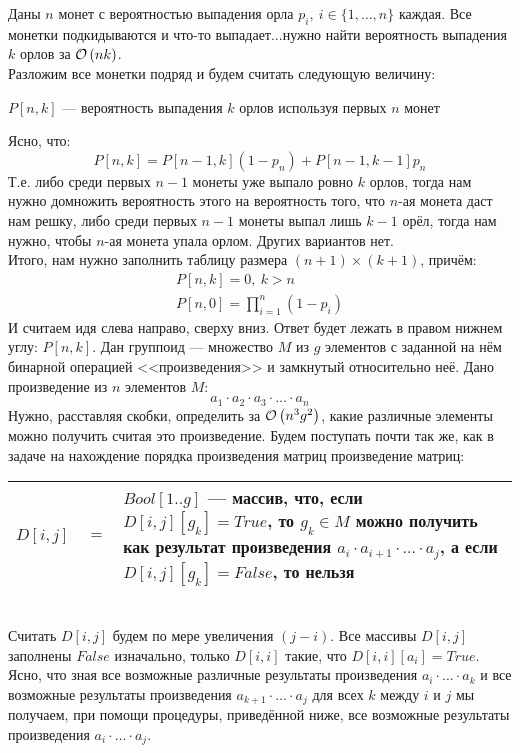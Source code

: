 Даны $n$ монет с вероятностью выпадения орла $p_i,\ i \in \lbrace 1,\ldots,n \rbrace$ каждая. Все монетки подкидываются
и что-то выпадает...нужно найти вероятность выпадения $k$ орлов за $\mathcal{O}\left(nk\right)$.\\
Разложим все монетки подряд и будем считать следующую величину: 
\begin{center}
$P[n,k]$ --- вероятность выпадения $k$ орлов используя первых $n$ монет
\end{center}
Ясно, что:
\[
P[n,k] = P[n-1,k](1-p_n)+P[n-1,k-1]p_n
\]
Т.е. либо среди первых $n-1$ монеты уже выпало ровно $k$ орлов, тогда нам нужно домножить вероятность этого на вероятность
того, что $n$-ая монета даст нам решку, либо среди первых $n-1$ монеты выпал лишь $k-1$ орёл, тогда нам нужно, чтобы 
$n$-ая монета упала орлом. Других вариантов нет.\\
Итого, нам нужно заполнить таблицу размера $(n+1) \times (k+1)$, причём:
\[ 
\begin{array}{c}
P[n,k]=0,\ k > n\\
P[n,0]=\prod_{i=1}^{n}{(1-p_i)} 
\end{array}
\]
И считаем идя слева направо, сверху вниз. Ответ будет лежать в правом нижнем углу: $P[n,k]$. \xqed
{}
Дан группоид --- множество $M$ из $g$ элементов с заданной на нём бинарной операцией <<произведения>> и 
замкнутый относительно неё. Дано произведение из $n$ элементов $M$:
\[
	a_1\cdot a_2 \cdot a_3 \cdot \ldots \cdot a_n
\]
Нужно, расставляя скобки, определить за $\mathcal{O}\left(n^3g^2\right)$, какие различные элементы можно получить считая это произведение.
Будем поступать почти так же, как в задаче на нахождение порядка произведения матриц произведение матриц:
\hfill\\
\begin{center}
\begin{tabular}{lcp{15cm}}
\hline
  $D[i,j]$ & $=$ & $Bool[1..g]$ --- массив, что, если $D[i,j][g_k]=True$, то $g_k \in M$ можно получить как результат произведения $a_i\cdot a_{i+1} \cdot \ldots \cdot a_j$, а если $D[i,j][g_k]=False$, то нельзя\\
\hline
\end{tabular}
\end{center}
\hfill\\

Считать $D[i,j]$ будем по мере увеличения $(j-i)$. Все массивы
$D[i,j]$ заполнены $False$ изначально, только $D[i,i]$ такие, что $D[i,i][a_i]=True$.\\
Ясно, что зная все возможные различные результаты произведения $a_i\cdot \ldots \cdot a_k$ и все возможные результаты
произведения $a_{k+1}\cdot \ldots \cdot a_j$ для всех $k$ между $i$ и $j$ мы получаем, при помощи процедуры, приведённой
ниже, все возможные результаты произведения $a_{i}\cdot \ldots \cdot a_{j}$.\\
\newpage
\begin{algorithmic}[1]
			\EndIf
		\EndFor
	\EndFor
\EndFor
\end{algorithmic}

